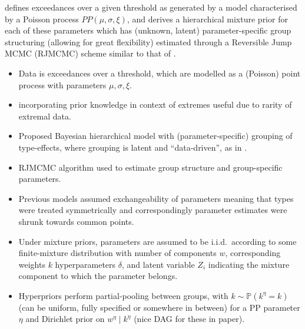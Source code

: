 \documentclass{article}
\numberwithin{equation}{section}
\begin{document}

\cite{Bottolo2003} defines exceedances over a given threshold as generated by a model characterised by a Poisson process $PP(\mu, \sigma, \xi)$, and derives a hierarchical mixture prior for each of these parameters which has (unknown, latent) parameter-specific group structuring (allowing for great flexibility) estimated through a Reversible Jump MCMC (RJMCMC) scheme similar to that of \cite{Rohrbeck2021}. 
\begin{itemize}
  \item Data is exceedances over a threshold, which are modelled as a (Poisson) point process with parameters $\mu, \sigma, \xi$.
  \item incorporating prior knowledge in context of extremes useful due to rarity of extremal data.
  \item Proposed Bayesian hierarchical model with (parameter-specific) grouping of type-effects, where grouping is latent and ``data-driven'', as in \cite{Dupuis2023}. 
  \item RJMCMC algorithm used to estimate group structure and group-specific parameters.
  \item Previous models assumed exchangeability of parameters meaning that types were treated symmetrically and correspondingly parameter estimates were shrunk towards common points. 
  \item Under mixture priors, parameters are assumed to be i.i.d.\ according to some finite-mixture distribution with number of components $w$, corresponding weights $k$ hyperparameters $\delta$, and latent variable $Z_i$ indicating the mixture component to which the parameter belongs.
  \item Hyperpriors perform partial-pooling between groups, with $k \sim \mathbb{P}(k^{\eta} = k)$ (can be uniform, fully specified or somewhere in between) for a PP parameter $\eta$ and Dirichlet prior on $w^{\eta} \mid k^{\eta}$ (nice DAG for these in paper). 
\end{itemize}
\end{document}
